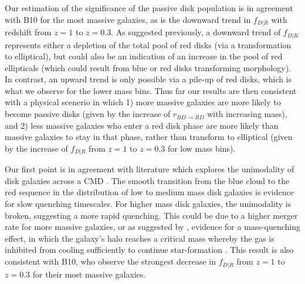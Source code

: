 Our estimation of the significance of the passive disk population is in agreement with B10 for the most massive galaxies, as is the downward trend in $f_{D|R}$ with redshift from $z=1$ to $z=0.3$. As suggested previously, a downward trend of $f_{D|R}$ represents either a depletion of the total pool of red disks (via a transformation to elliptical), but could also be an indication of an increase in the pool of red ellipticals (which could result from blue or red disks transforming morphology). In contrast, an upward trend is only possible via a pile-up of red disks, which is what we observe for the lower mass bins. Thus far our results are then consistent with a physical scenerio in which 1) more massive galaxies are more likely to become passive disks (given by the increase of $r_{BD \rightarrow RD}$ with increasing mass), and 2) less massive galaxies who enter a red disk phase are more likely than massive galaxies to stay in that phase, rather than transform to elliptical (given by the increase of $f_{D|R}$ from $z=1$ to $z=0.3$ for low mass bins).

Our first point is in agreement with literature which explores the unimodality of disk galaxies across a CMD \citep{Schawinski2014,Powell2017}. The smooth transition from the blue cloud to the red sequence in the distribution of low to medium mass disk galaxies is evidence for slow quenching timescales. For higher mass disk galaxies, the unimodality is broken, suggesting a more rapid quenching. This could be due to a higher merger rate for more massive galaxies, or as suggested by \citet{Schawinski2014}, evidence for a mass-quenching effect, in which the galaxy's halo reaches a critical mass whereby the gas is inhibited from cooling sufficiently to continue star-formation \citep{Kormendy2004,Dekel2006,Peng2010}. This result is also consistent with B10, who observe the strongest decrease in $f_{D|R}$ from $z=1$ to $z=0.3$ for their most massive galaxies.


